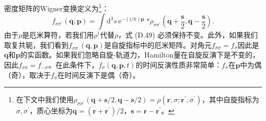 密度矩阵的Wigner变换定义为\footnote{在下文中我们使用$\rho_{\sigma\sigma^{\prime}}(\boldsymbol{q}+\boldsymbol{s}/2,\boldsymbol{q}-\boldsymbol{s}/2)=\rho(\boldsymbol{r},\sigma;\boldsymbol{r}^{\prime},\sigma^{\prime})$，其中自旋指标为$\sigma,\sigma^{\prime}$，质心坐标为$\boldsymbol{q}=(\boldsymbol{r}+\boldsymbol{r}^{\prime})/2$，$\boldsymbol{s}=\boldsymbol{r}-\boldsymbol{r}^{\prime}$。}：
\begin{equation}
f_{\sigma\sigma^{\prime}}(\boldsymbol{q},\boldsymbol{p})=\int\mathrm{d}^{3}s\,\mathrm{e}^{-(\mathrm{i}/\hbar)\boldsymbol{p}\cdot\boldsymbol{s}}\rho_{\sigma\sigma^{\prime}}\left(\boldsymbol{q}+\frac{\boldsymbol{s}}{2},\boldsymbol{q}-\frac{\boldsymbol{s}}{2}\right).\label{eq:appendix_d_wigner_transform_def}
\end{equation}
由于$\rho$是厄米算符，若我们用$\rho^{\dagger}$代替$\rho$，式 (D.49) 必须保持不变。此外，如果我们取复共轭，我们看到$f_{\sigma\sigma^{\prime}}(\boldsymbol{q},\boldsymbol{p})$是自旋指标中的厄米矩阵。对角元$f_{\sigma\sigma}=f_{\sigma}$因此是$\boldsymbol{q}$和$\boldsymbol{p}$的实函数。如果我们忽略自旋-轨道力，Hamilton量在自旋反演下是不变的，因此$f_{\sigma\sigma}=f_{-\sigma}$。在此条件下，$f_{\sigma}(\boldsymbol{q},\boldsymbol{p},t)$的时间反演性质非常简单：$f_{\sigma}$在$\boldsymbol{p}$中为偶（奇），取决于$f_{\sigma}$在时间反演下是偶（奇）。


